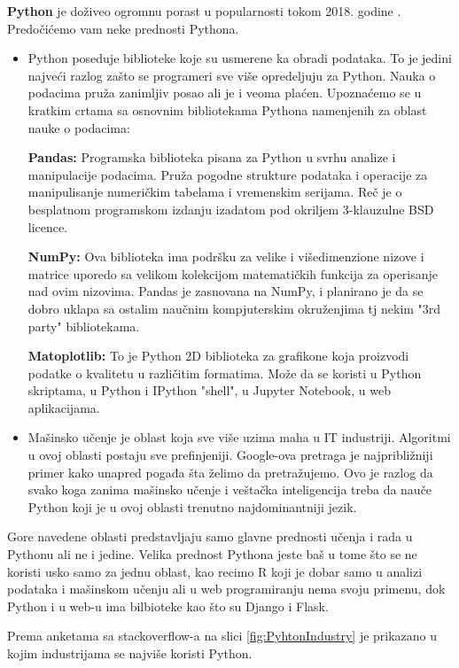 \documentclass[a4paper]{article}
\begin{document}
\textbf{Python} je doživeo ogromnu porast u popularnosti tokom 2018. godine \cite{python}. Predočićemo vam neke prednosti Pythona.
\begin{itemize}
    \item Python poseduje biblioteke koje su usmerene ka obradi podataka. To je jedini najveći razlog zašto se programeri sve više opredeljuju za Python. Nauka o podacima pruža zanimljiv posao ali je i veoma plaćen. Upoznaćemo se u kratkim crtama sa osnovnim bibliotekama Pythona namenjenih za oblast nauke o podacima:
    
    \textbf{Pandas:} Programska biblioteka pisana za Python u svrhu analize i manipulacije podacima. Pruža pogodne strukture podataka i operacije za manipulisanje numeričkim tabelama i vremenskim serijama. Reč je o besplatnom programskom izdanju izadatom pod okriljem 3-klauzulne BSD licence.
    
    \textbf{NumPy:} Ova biblioteka ima podršku za velike i višedimenzione nizove i matrice uporedo sa velikom kolekcijom matematičkih funkcija za operisanje nad ovim nizovima. Pandas je zasnovana na NumPy, i planirano je da se dobro uklapa sa ostalim naučnim kompjuterskim okruženjima tj nekim "3rd party" bibliotekama.
    
    \textbf{Matoplotlib:} To je Python 2D biblioteka za grafikone koja proizvodi podatke o kvalitetu u različitim formatima. Može da se koristi u Python skriptama, u Python i IPython "shell", u Jupyter Notebook, u web aplikacijama.

    \item Mašinsko učenje je oblast koja sve više uzima maha u IT industriji. Algoritmi u ovoj oblasti postaju sve prefinjeniji. Google-ova pretraga je najpribližniji primer kako unapred pogađa šta želimo da pretražujemo. Ovo je razlog da svako koga zanima mašinsko učenje i veštačka inteligencija treba da nauče Python koji je u ovoj oblasti trenutno najdominantniji jezik.
\end{itemize}
    
    Gore navedene oblasti predstavljaju samo glavne prednosti učenja i rada u Pythonu ali ne i jedine. Velika prednost Pythona jeste baš u tome što se ne koristi usko samo za jednu oblast, kao recimo R koji je dobar samo u analizi podataka i mašinskom učenju ali u web programiranju nema svoju primenu, dok Python i u web-u ima bilbioteke kao što su Django i Flask.
    
    Prema anketama sa stackoverflow-a na slici \ref{fig:PyhtonIndustry} je prikazano u kojim industrijama se najviše koristi Python.
    
\end{document}
